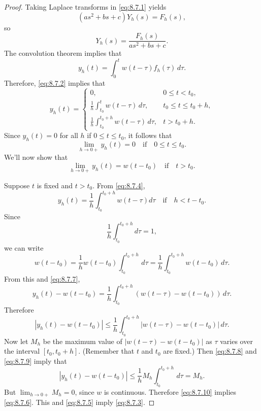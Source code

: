 \begin{proof}
 Taking Laplace transforms in \eqref{eq:8.7.1} yields
\[
(as^2+bs+c)Y_h(s)=F_h(s),
\]
so
\[
Y_h(s)=\frac{F_h(s)}{as^2+bs+c}.
\]
The convolution theorem implies that
\[
y_h(t)=\int_0^t w(t-\tau)f_h(\tau)\,d\tau.
\]
Therefore,  \eqref{eq:8.7.2} implies that
\begin{equation} \label{eq:8.7.4}
y_h(t)=\begin{cases}
0,&0\le t<t_0,\\
\frac{1}{h}\int_{t_0}^tw(t-\tau)\,d\tau,&t_0\le t\le t_0+h,\\
\frac{1}{h}\int_{t_0}^{t_0+h}w(t-\tau)\,d\tau,&t>t_0+h.
\end{cases}
\end{equation}
Since $y_h(t)=0$ for all $h$ if $0\le t\le t_0$, it follows that
\begin{equation} \label{eq:8.7.5}
\lim_{h\to0+}y_h(t)=0\quad\text{if}\quad0\le t\le t_0.
\end{equation}
We'll now show that
\begin{equation} \label{eq:8.7.6}
\lim_{h\to0+}y_h(t)=w(t-t_0)\quad\text{if}\quad t>t_0.
\end{equation}

Suppose   $t$ is fixed and $t>t_0$.
From
\eqref{eq:8.7.4},
\begin{equation} \label{eq:8.7.7}
y_h(t)=\frac{1}{h}\int_{t_0}^{t_0+h}w(t-\tau)d\tau\quad\text{if}\quad
h<t-t_0.
\end{equation}
Since
\begin{equation} \label{eq:8.7.8}
\frac{1}{h}\int_{t_0}^{t_0+h}d\tau=1,
\end{equation}
we can write
\[
w(t-t_0)=\frac{1}{h}w(t-t_0)\int_{t_0}^{t_0+h}\,d\tau=
\frac{1}{h}\int_{t_0}^{t_0+h}w(t-t_0)\,d\tau.
\]
From this and \eqref{eq:8.7.7},
\[
y_h(t)-w(t-t_0)=
\frac{1}{h}\int_{t_0}^{t_0+h}\left(w(t-\tau)-w(t-t_0)\right)\,d\tau.
\]
Therefore
\begin{equation} \label{eq:8.7.9}
|y_h(t)-w(t-t_0)|\le
\frac{1}{h}\int_{t_0}^{t_0+h}|w(t-\tau)-w(t-t_0)|\,d\tau.
\end{equation}
Now let $M_h$ be the maximum value of $|w(t-\tau)-w(t-t_0)|$ as $\tau$
varies over the interval $[t_0,t_0+h]$. (Remember that $t$ and $t_0$
are fixed.) Then \eqref{eq:8.7.8} and \eqref{eq:8.7.9} imply that
\begin{equation} \label{eq:8.7.10}
|y_h(t)-w(t-t_0)|\le
\frac{1}{h}M_h\int_{t_0}^{t_0+h}\,d\tau=M_h.
\end{equation}
But $\lim_{h\to0+}M_h=0$, since $w$ is continuous.
Therefore \eqref{eq:8.7.10} implies \eqref{eq:8.7.6}.
This and \eqref{eq:8.7.5} imply \eqref{eq:8.7.3}.
\end{proof}

